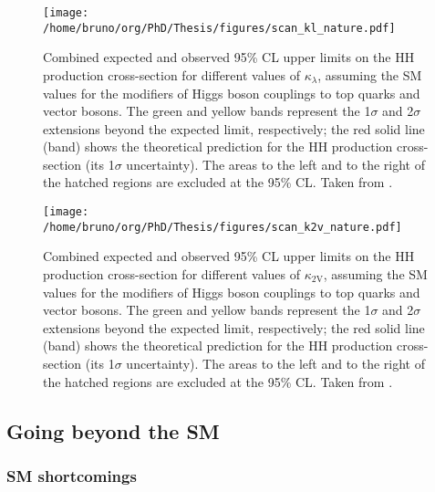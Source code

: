\documentclass[11pt]{article}
\newcommand{\kl}{\kappa_{\lambda}}
\newcommand{\kvv}{\kappa_{\text{2V}}}
\begin{document}
\begin{figure}[htbp]
\centering
\texttt{[image: /home/bruno/org/PhD/Thesis/figures/scan\_kl\_nature.pdf]}
\caption{\label{fig:scan_kl_nature}Combined expected and observed 95\% CL upper limits on the HH production cross-section for different values of \(\kl\), assuming the SM values for the modifiers of Higgs boson couplings to top quarks and vector bosons. The green and yellow bands represent the 1\(\sigma\) and 2\(\sigma\) extensions beyond the expected limit, respectively; the red solid line (band) shows the theoretical prediction for the HH production cross-section (its 1\(\sigma\) uncertainty). The areas to the left and to the right of the hatched regions are excluded at the 95\% CL. Taken from \cite{higgs_10_years}.}
\end{figure}

\begin{figure}[htbp]
\centering
\texttt{[image: /home/bruno/org/PhD/Thesis/figures/scan\_k2v\_nature.pdf]}
\caption{\label{fig:scan_k2v_nature}Combined expected and observed 95\% CL upper limits on the HH production cross-section for different values of \(\kvv\), assuming the SM values for the modifiers of Higgs boson couplings to top quarks and vector bosons. The green and yellow bands represent the 1\(\sigma\) and 2\(\sigma\) extensions beyond the expected limit, respectively; the red solid line (band) shows the theoretical prediction for the HH production cross-section (its 1\(\sigma\) uncertainty). The areas to the left and to the right of the hatched regions are excluded at the 95\% CL. Taken from \cite{higgs_10_years}.}
\end{figure}    
\subsection{Going beyond the SM}
\label{sec:org1640e1f}
\subsubsection{SM shortcomings}
\label{sec:org4548893}
\label{sec:SMShortComings}
\end{document}
